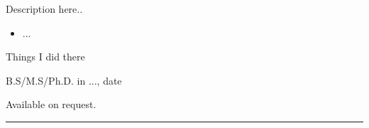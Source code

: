 \documentclass[10pt]{article}
\begin{document}
\begin{llist}
\noindent
Description here..
\begin{itemize}
\item ...
\end{itemize}

% 
\noindent
Things I did there

\nocite{hohn01}
\nocite{hohn11:_pde}


B.S/M.S/Ph.D. in ..., date

Available on request.  
\end{llist}

%
\noindent\rule{\linewidth}{.005in}
%
\end{document}
